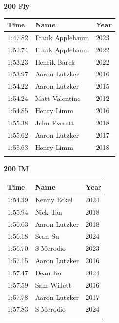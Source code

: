 \vspace{1.2em}
\noindent\begin{minipage}[t]{0.48\textwidth}
\centering
\textbf{\textcolor{teamprimary}{200 Fly}}\par
\vspace{0.5em}
\centering
\small
\renewcommand{\arraystretch}{1.0}
\setlength{\tabcolsep}{4pt}
\begin{tabular}{@{}p{1.8cm}p{3.0cm}p{1.0cm}@{}}
\toprule
\textbf{Time} & \textbf{Name} & \textbf{Year} \\
\midrule
1:47.82 & Frank Applebaum & 2023 \\
1:52.74 & Frank Applebaum & 2022 \\
1:53.23 & Henrik Barck & 2022 \\
1:53.97 & Aaron Lutzker & 2016 \\
1:54.22 & Aaron Lutzker & 2015 \\
1:54.24 & Matt Valentine & 2012 \\
1:54.85 & Henry Limm & 2016 \\
1:55.38 & John Everett & 2018 \\
1:55.62 & Aaron Lutzker & 2017 \\
1:55.63 & Henry Limm & 2018 \\
\bottomrule
\vspace{0.5em}
\end{tabular}
\end{minipage}
\hfill
\begin{minipage}[t]{0.48\textwidth}
\centering
\textbf{\textcolor{teamprimary}{200 IM}}\par
\vspace{0.5em}
\centering
\small
\renewcommand{\arraystretch}{1.0}
\setlength{\tabcolsep}{4pt}
\begin{tabular}{@{}p{1.8cm}p{3.0cm}p{1.0cm}@{}}
\toprule
\textbf{Time} & \textbf{Name} & \textbf{Year} \\
\midrule
1:54.39 & Kenny Eckel & 2024 \\
1:55.94 & Nick Tan & 2018 \\
1:56.03 & Aaron Lutzker & 2018 \\
1:56.18 & Sean Su & 2024 \\
1:56.70 & S Merodio & 2023 \\
1:57.15 & Aaron Lutzker & 2016 \\
1:57.47 & Dean Ko & 2024 \\
1:57.59 & Sam Willett & 2016 \\
1:57.78 & Aaron Lutzker & 2017 \\
1:57.83 & S Merodio & 2024 \\
\bottomrule
\vspace{0.5em}
\end{tabular}
\end{minipage}
